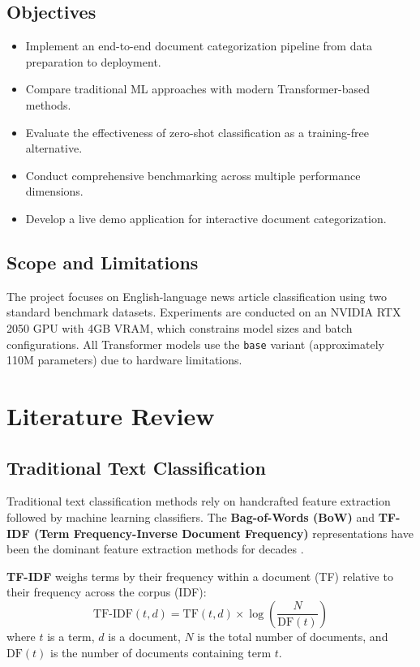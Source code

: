 \documentclass[12pt, a4paper]{article}
\begin{document}
\subsection{Objectives}
\begin{itemize}
    \item Implement an end-to-end document categorization pipeline from data preparation to deployment.
    \item Compare traditional ML approaches with modern Transformer-based methods.
    \item Evaluate the effectiveness of zero-shot classification as a training-free alternative.
    \item Conduct comprehensive benchmarking across multiple performance dimensions.
    \item Develop a live demo application for interactive document categorization.
\end{itemize}

\subsection{Scope and Limitations}
The project focuses on English-language news article classification using two standard benchmark datasets. Experiments are conducted on an NVIDIA RTX 2050 GPU with 4GB VRAM, which constrains model sizes and batch configurations. All Transformer models use the \texttt{base} variant (approximately 110M parameters) due to hardware limitations.

\section{Literature Review}

\subsection{Traditional Text Classification}
Traditional text classification methods rely on handcrafted feature extraction followed by machine learning classifiers. The \textbf{Bag-of-Words (BoW)} and \textbf{TF-IDF (Term Frequency-Inverse Document Frequency)} representations have been the dominant feature extraction methods for decades \cite{manning2008introduction}.

\textbf{TF-IDF} weighs terms by their frequency within a document (TF) relative to their frequency across the corpus (IDF):
\begin{equation}
    \text{TF-IDF}(t, d) = \text{TF}(t, d) \times \log\left(\frac{N}{\text{DF}(t)}\right)
\end{equation}
where $t$ is a term, $d$ is a document, $N$ is the total number of documents, and $\text{DF}(t)$ is the number of documents containing term $t$.
\end{document}
